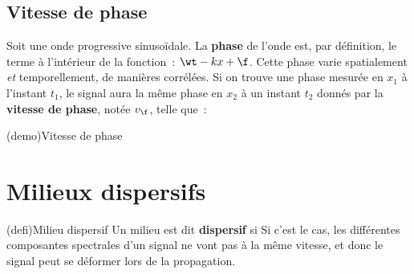 \documentclass[../../main/main.tex]{subfiles}
\begin{document}
\subsection{Vitesse de phase}

Soit une onde progressive sinusoïdale. La \textbf{phase} de l'onde est, par
définition, le terme à l'intérieur de la fonction~: $\wt-kx+\f$. Cette phase
varie spatialement \textit{et} temporellement, de manières corrélées. Si on
trouve une phase mesurée en $x_1$ à l'instant $t_1$, le signal aura la même
phase en $x_2$ à un instant $t_2$ donnés par la \textbf{vitesse de phase}, notée
$v_\f$, telle que~:
\psw{\[\boxed{v_\f = \frac{x_2-x_1}{t_2-t_1}}\]}
\vspace{-10pt}
\begin{tcb}[sidebyside](demo){Vitesse de phase}
	\tcblower
	\centering
	\vspace{-10pt}
\end{tcb}

\section{Milieux dispersifs}

\begin{tcb*}(defi){Milieu dispersif}
	Un milieu est dit \textbf{dispersif} si
	\bigbreak
	Si c'est le cas, les différentes composantes spectrales d'un signal ne vont
	pas à la même vitesse, et donc le signal peut se déformer lors de la
	propagation.
\end{tcb*}
\end{document}
